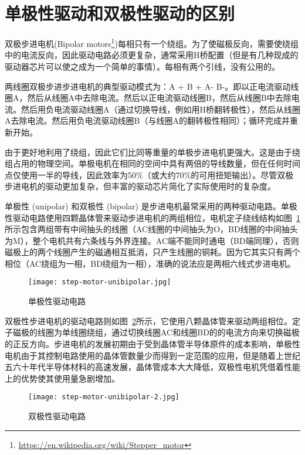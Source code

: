 \section{单极性驱动和双极性驱动的区别}

双极步进电机(Bipolar motors\footnote{\url{https://en.wikipedia.org/wiki/Stepper_motor}})每相只有一个绕组。为了使磁极反向，需要使绕组中的电流反向，因此驱动电路必须更复杂，通常采用H桥配置（但是有几种现成的驱动器芯片可以使之成为一个简单的事情）。每相有两个引线，没有公用的。

两线圈双极步进步进电机的典型驱动模式为：A + B + A- B-。即以正电流驱动线圈A，然后从线圈A中去除电流。然后以正电流驱动线圈B，然后从线圈B中去除电流。然后用负电流驱动线圈A（通过切换导线，例如用H桥翻转极性），然后从线圈A去除电流。然后用负电流驱动线圈B（与线圈A的翻转极性相同）；循环完成并重新开始。

由于更好地利用了绕组，因此它们比同等重量的单极步进电机更强大。这是由于绕组占用的物理空间。单极电机在相同的空间中具有两倍的导线数量，但在任何时间点仅使用一半的导线，因此效率为50\%（或大约70\%的可用扭矩输出）。尽管双极步进电机的驱动更加复杂，但丰富的驱动芯片简化了实际使用时的复杂度。

单极性 (unipolar) 和双极性 (bipolar) 是步进电机最常采用的两种驱动电路。单极性驱动电路使用四颗晶体管来驱动步进电机的两组相位，电机定子绕线结构如图~\ref{fig:step-motor-unibipolar}所示包含两组带有中间抽头的线圈（AC线圈的中间抽头为O，BD线圈的中间抽头为M），整个电机共有六条线与外界连接。AC端不能同时通电（BD端同理），否则磁极上的两个线圈产生的磁通相互抵消，只产生线圈的铜耗。因为它其实只有两个相位（AC绕组为一相，BD绕组为一相），准确的说法应是两相六线式步进电机。

\begin{figure}[htbp]
    \centering
    \texttt{[image: step-motor-unibipolar.jpg]}
    \caption{单极性驱动电路}
    \label{fig:step-motor-unibipolar}
\end{figure}

双极性步进电机的驱动电路则如图~\ref{fig:step-motor-unibipolar-2}所示，它使用八颗晶体管来驱动两组相位。定子磁极的线圈为单线圈绕组，通过切换线圈AC和线圈BD的的电流方向来切换磁极的正反方向。步进电机的发展初期由于受到晶体管半导体原件的成本影响，单极性电机由于其控制电路使用的晶体管数量少而得到一定范围的应用，但是随着上世纪五六十年代半导体材料的高速发展，晶体管成本大大降低，双极性电机凭借着性能上的优势使其使用量急剧增加。

\begin{figure}[htbp]
    \centering
    \texttt{[image: step-motor-unibipolar-2.jpg]}
    \caption{双极性驱动电路}
    \label{fig:step-motor-unibipolar-2}
\end{figure}

